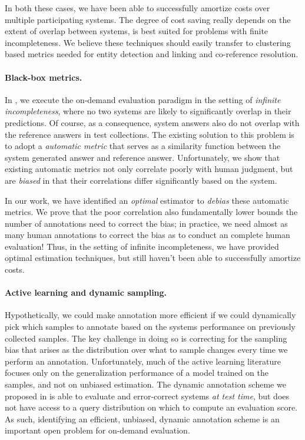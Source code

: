 In both these cases, we have been able to successfully amortize costs over multiple participating systems.
The degree of cost saving really depends on the extent of overlap between systems, is best suited for problems with finite incompleteness.
We believe these techniques should easily transfer to clustering based metrics needed for entity detection and linking and co-reference resolution.

\paragraph{Black-box metrics.}
In , we execute the on-demand evaluation paradigm in the setting of \textit{infinite incompleteness}, where no two systems are likely to significantly overlap in their predictions.
Of course, as a consequence, system answers also do not overlap with the reference answers in test collections.
The existing solution to this problem is to adopt a \textit{automatic metric} that serves as a similarity function between the system generated answer and reference answer.
Unfortunately, we show that existing automatic metrics not only correlate poorly with human judgment, but are \textit{biased} in that their correlations differ significantly based on the system.

In our work, we have identified an \textit{optimal} estimator to \textit{debias} these automatic metrics.
We prove that the poor correlation also fundamentally lower bounds the number of annotations need to correct the bias;
  in practice, we need almost as many human annotations to correct the bias as to conduct an complete human evaluation!
Thus, in the setting of infinite incompleteness, we have provided optimal estimation techniques, but still haven't been able to successfully amortize costs.

\paragraph{Active learning and dynamic sampling.}
Hypothetically, we could make annotation more efficient if we could dynamically pick which samples to annotate based on the systems performance on previously collected samples.
The key challenge in doing so is correcting for the sampling bias that arises as the distribution over what to sample changes every time we perform an annotation.
Unfortunately, much of the active learning literature focuses only on the generalization performance of a model trained on the samples, and not on unbiased estimation.
The dynamic annotation scheme we proposed in  is able to evaluate and error-correct systems \textit{at test time}, but does not have access to a query distribution on which to compute an evaluation score.
As such, identifying an efficient, unbiased, dynamic annotation scheme is an important open problem for on-demand evaluation.


